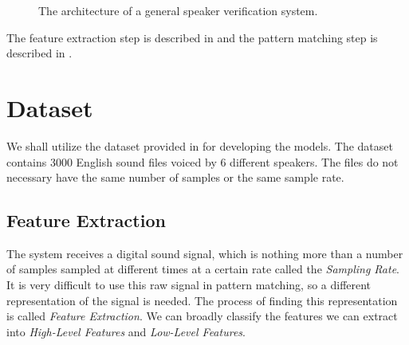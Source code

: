 \documentclass[twocolumn]{article}
\begin{document}
\begin{figure}
\begin{center}
\end{center}
\caption{The architecture of a general speaker verification system.}
\label{fig:SystemArchitecture}
\end{figure}

The feature extraction step is described in  and the pattern
matching step is described in .

\section{Dataset}
\label{sec:Dataset}

We shall utilize the dataset provided in \autocite{Zohar2018} for developing the
models. The dataset contains 3000 English sound files voiced by 6 different
speakers. The files do not necessary have the same number of samples or the same
sample rate.

\subsection{Feature Extraction}

The system receives a digital sound signal, which is nothing more than a number
of samples sampled at different times at a certain rate called the
\emph{Sampling Rate}. It is very difficult to use this raw signal in pattern
matching, so a different representation of the signal is needed. The process of
finding this representation is called \emph{Feature Extraction}. We can broadly
classify the features we can extract into \emph{High-Level Features} and
\emph{Low-Level Features}.
\end{document}
